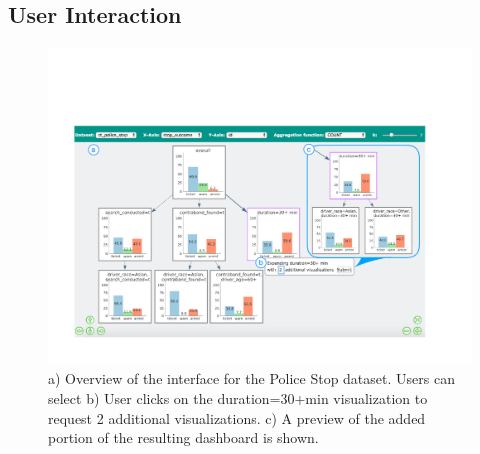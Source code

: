 \subsection{User Interaction\label{sec:interaction}}
\begin{figure}[ht!]
\centering
\includegraphics[width=0.9\linewidth,frame]{figures/overview_interface_expand.pdf}
\caption{a) Overview of the \system interface for the Police Stop dataset. Users can  select  b) User clicks on the duration=30+min visualization to request 2 additional visualizations. c) A preview of the added portion of the resulting dashboard is shown.}
\label{fig:overview}
\vspace{-10pt}
\end{figure}%

